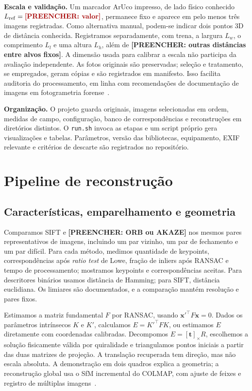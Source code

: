 \documentclass[10pt,a4paper]{article}
\newcommand{\Resultado}[1]{\textcolor{red!65!black}{\textbf{[PREENCHER: #1]}}}
\begin{document}
\textbf{Escala e validação.} Um marcador ArUco impresso, de lado físico conhecido $L_{\rm ref}=\Resultado{valor}$, permanece fixo e aparece em pelo menos três imagens registradas. Como alternativa manual, podem-se indicar dois pontos 3D de distância conhecida. Registramos separadamente, com trena, a largura $L_w$, o comprimento $L_l$ e uma altura $L_h$, além de \Resultado{outras distâncias entre alvos fixos}. A dimensão usada para calibrar a escala não participa da avaliação independente. As fotos originais são preservadas; seleção e tratamento, se empregados, geram cópias e são registrados em manifesto. Isso facilita auditoria do processamento, em linha com recomendações de documentação de imagens em fotogrametria forense~\cite{swgde}.

\textbf{Organização.} O projeto guarda originais, imagens selecionadas em ordem, medidas de campo, configuração, banco de correspondências e reconstruções em diretórios distintos. O \texttt{run.sh} invoca as etapas e um script próprio gera visualizações e tabelas. Parâmetros, versão das bibliotecas, equipamento, EXIF relevante e critérios de descarte são registrados no repositório.

\section{Pipeline de reconstrução}
\subsection{Características, emparelhamento e geometria}
Comparamos SIFT e \Resultado{ORB ou AKAZE} nos mesmos pares representativos de imagens, incluindo um par vizinho, um par de fechamento e um par difícil. Para cada método, medimos quantidade de keypoints, correspondências após \emph{ratio test} de Lowe, fração de inliers após RANSAC e tempo de processamento; mostramos keypoints e correspondências aceitas. Para descritores binários usamos distância de Hamming; para SIFT, distância euclidiana. Os limiares são documentados, e a comparação mantém resolução e pares fixos.

Estimamos a matriz fundamental $F$ por RANSAC, usando $\mathbf{x}'^{\top}F\mathbf{x}=0$. Dados os parâmetros intrínsecos $K$ e $K'$, calculamos $E=K'^{\top}FK$, ou estimamos $E$ diretamente com coordenadas calibradas. Decompomos $E=[\mathbf{t}]_\times R$, escolhemos a solução fisicamente válida por quiralidade e triangulamos pontos iniciais a partir das duas matrizes de projeção. A translação recuperada tem direção, mas não escala absoluta. A demonstração em dois quadros explica a geometria; a reconstrução global usa o SfM incremental do COLMAP, com ajuste de feixes e registro de múltiplas imagens~\cite{colmap}.
\end{document}
